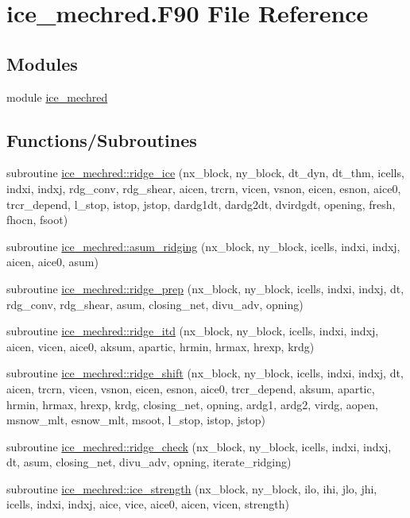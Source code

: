 \hypertarget{ice__mechred_8F90}{
\section{ice\_\-mechred.F90 File Reference}
\label{ice__mechred_8F90}
}
\subsection*{Modules}
\begin{DoxyCompactItemize}
\item 
module \hyperlink{namespaceice__mechred}{ice\_\-mechred}
\end{DoxyCompactItemize}
\subsection*{Functions/Subroutines}
\begin{DoxyCompactItemize}
\item 
subroutine \hyperlink{namespaceice__mechred_a22ae992e7f20fe021992af92a29f81e1}{ice\_\-mechred::ridge\_\-ice} (nx\_\-block, ny\_\-block, dt\_\-dyn, dt\_\-thm, icells, indxi, indxj, rdg\_\-conv, rdg\_\-shear, aicen, trcrn, vicen, vsnon, eicen, esnon, aice0, trcr\_\-depend, l\_\-stop, istop, jstop, dardg1dt, dardg2dt, dvirdgdt, opening, fresh, fhocn, fsoot)
\item 
subroutine \hyperlink{namespaceice__mechred_a0b56099ad3d0f301b3dfaab8aba87ef4}{ice\_\-mechred::asum\_\-ridging} (nx\_\-block, ny\_\-block, icells, indxi, indxj, aicen, aice0, asum)
\item 
subroutine \hyperlink{namespaceice__mechred_a387bb4361bc395e2cc8d9ab50ef03728}{ice\_\-mechred::ridge\_\-prep} (nx\_\-block, ny\_\-block, icells, indxi, indxj, dt, rdg\_\-conv, rdg\_\-shear, asum, closing\_\-net, divu\_\-adv, opning)
\item 
subroutine \hyperlink{namespaceice__mechred_aa337d7f3df7eb6c6f9e3724e2d350e0c}{ice\_\-mechred::ridge\_\-itd} (nx\_\-block, ny\_\-block, icells, indxi, indxj, aicen, vicen, aice0, aksum, apartic, hrmin, hrmax, hrexp, krdg)
\item 
subroutine \hyperlink{namespaceice__mechred_ad5b2abaa36fa52ab9a96420dbf8d48cc}{ice\_\-mechred::ridge\_\-shift} (nx\_\-block, ny\_\-block, icells, indxi, indxj, dt, aicen, trcrn, vicen, vsnon, eicen, esnon, aice0, trcr\_\-depend, aksum, apartic, hrmin, hrmax, hrexp, krdg, closing\_\-net, opning, ardg1, ardg2, virdg, aopen, msnow\_\-mlt, esnow\_\-mlt, msoot, l\_\-stop, istop, jstop)
\item 
subroutine \hyperlink{namespaceice__mechred_af7cf08ba4d3da94152517c6058b2f219}{ice\_\-mechred::ridge\_\-check} (nx\_\-block, ny\_\-block, icells, indxi, indxj, dt, asum, closing\_\-net, divu\_\-adv, opning, iterate\_\-ridging)
\item 
subroutine \hyperlink{namespaceice__mechred_a11d0a7efe6faca932079c613d5a7fdb7}{ice\_\-mechred::ice\_\-strength} (nx\_\-block, ny\_\-block, ilo, ihi, jlo, jhi, icells, indxi, indxj, aice, vice, aice0, aicen, vicen, strength)
\end{DoxyCompactItemize}

